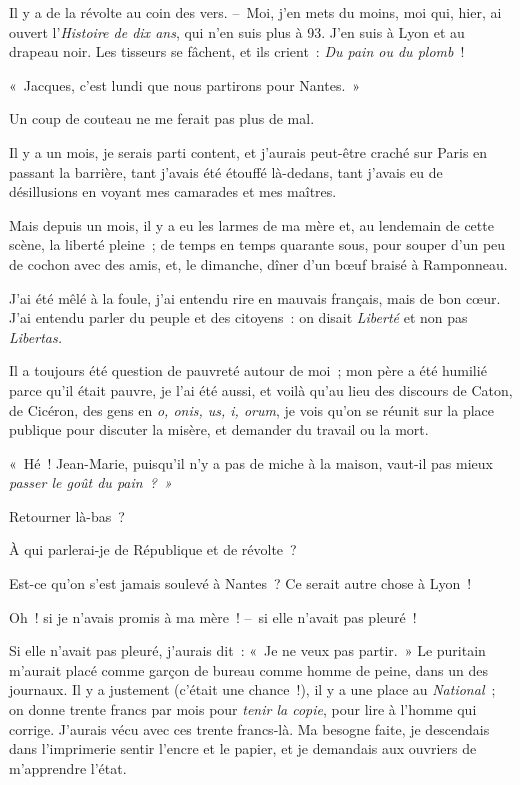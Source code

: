 \documentclass[french,twoside]{book} %
\begin{document}
\noindent Il y a de la révolte au coin des vers. – Moi, j’en mets du moins, moi qui, hier, ai ouvert l’\emph{Histoire de dix ans}, qui n’en suis plus à 93. J’en suis à Lyon et au drapeau noir. Les tisseurs se fâchent, et ils crient : \emph{Du pain ou du plomb} !\par
« Jacques, c’est lundi que nous partirons pour Nantes. »\par
Un coup de couteau ne me ferait pas plus de mal.\par
Il y a un mois, je serais parti content, et j’aurais peut-être craché sur Paris en passant la barrière, tant j’avais été étouffé là-dedans, tant j’avais eu de désillusions en voyant mes camarades et mes maîtres.\par
Mais depuis un mois, il y a eu les larmes de ma mère et, au lendemain de cette scène, la liberté pleine ; de temps en temps quarante sous, pour souper d’un peu de cochon avec des amis, et, le dimanche, dîner d’un bœuf braisé à Ramponneau.\par
J’ai été mêlé à la foule, j’ai entendu rire en mauvais français, mais de bon cœur. J’ai entendu parler du peuple et des citoyens : on disait \emph{Liberté} et non pas \emph{Libertas.}\par
\bigbreak
\noindent Il a toujours été question de pauvreté autour de moi ; mon père a été humilié parce qu’il était pauvre, je l’ai été aussi, et voilà qu’au lieu des discours de Caton, de Cicéron, des gens en \emph{o, onis, us, i, orum}, je vois qu’on se réunit sur la place publique pour discuter la misère, et demander du travail ou la mort.\par
« Hé ! Jean-Marie, puisqu’il n’y a pas de miche à la maison, vaut-il pas mieux \emph{passer le goût du pain ? »}\par
\bigbreak
\noindent Retourner là-bas ?\par
À qui parlerai-je de République et de révolte ?\par
Est-ce qu’on s’est jamais soulevé à Nantes ? Ce serait autre chose à Lyon !\par
Oh ! si je n’avais promis à ma mère ! – si elle n’avait pas pleuré !\par
Si elle n’avait pas pleuré, j’aurais dit : « Je ne veux pas partir. » Le puritain m’aurait placé comme garçon de bureau comme homme de peine, dans un des journaux. Il y a justement (c’était une chance !), il y a une place au \emph{National} ; on donne trente francs par mois pour \emph{tenir la copie}, pour lire à l’homme qui corrige. J’aurais vécu avec ces trente francs-là. Ma besogne faite, je descendais dans l’imprimerie sentir l’encre et le papier, et je demandais aux ouvriers de m’apprendre l’état.\par
\end{document}
